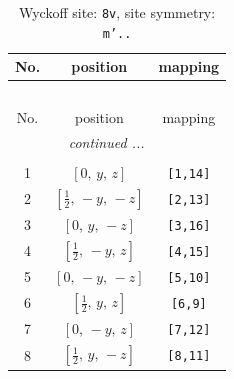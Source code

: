 \documentclass[fleqn,8pt]{jsarticle}
\begin{document}
\begin{longtable}{ccc}
\caption{Wyckoff site: {\tt 8v}, site symmetry: {\tt m'..}}
 \\
 \hline \hline
No. & position & mapping \\ \hline \endfirsthead

\multicolumn{2}{l}{\tablename\ \thetable{}} \\
 \hline \hline
No. & position & mapping \\ \hline \endhead

 \hline \hline
\multicolumn{2}{r}{\footnotesize\it continued ...} \\ \endfoot

 \hline \hline
\multicolumn{2}{r}{} \\ \endlastfoot

1 & $\left[ 0,\, y,\, z \right]$ & {\tt [1,14]} \\ \hline
2 & $\left[ \frac{1}{2},\, - y,\, - z \right]$ & {\tt [2,13]} \\ \hline
3 & $\left[ 0,\, y,\, - z \right]$ & {\tt [3,16]} \\ \hline
4 & $\left[ \frac{1}{2},\, - y,\, z \right]$ & {\tt [4,15]} \\ \hline
5 & $\left[ 0,\, - y,\, - z \right]$ & {\tt [5,10]} \\ \hline
6 & $\left[ \frac{1}{2},\, y,\, z \right]$ & {\tt [6,9]} \\ \hline
7 & $\left[ 0,\, - y,\, z \right]$ & {\tt [7,12]} \\ \hline
8 & $\left[ \frac{1}{2},\, y,\, - z \right]$ & {\tt [8,11]} \\
\end{longtable}
\renewcommand{\arraystretch}{1.2}
\end{document}

